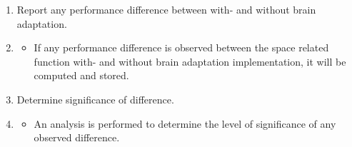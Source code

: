 \begin{enumerate}
\begin{itemize}
    \end{itemize}
    \item Report any performance difference between with- and without brain adaptation.
    \item \begin{itemize}
        \item If any performance difference is observed between the space related function with- and without brain adaptation implementation, it will be computed and stored.
    \end{itemize}
    \item Determine significance of difference.
    \item \begin{itemize}
        \item An analysis is performed to determine the level of significance  of any observed difference.
    \end{itemize}
\end{enumerate}